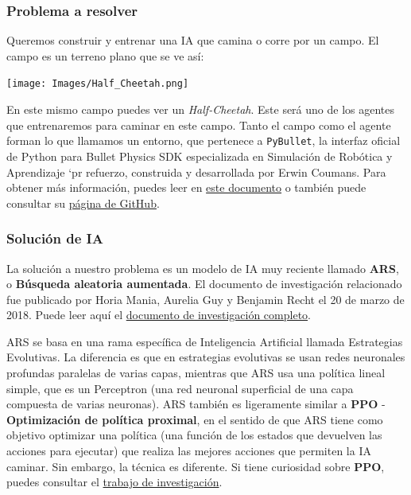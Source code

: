 \documentclass[
]{book}
\begin{document}
\hypertarget{problema-a-resolver-2}{%
\subsubsection{Problema a resolver}\label{problema-a-resolver-2}}

Queremos construir y entrenar una IA que camina o corre por un campo. El campo es un terreno plano que se ve así:

\texttt{[image: Images/Half\_Cheetah.png]}

En este mismo campo puedes ver un \emph{Half-Cheetah}. Este será uno de los agentes que entrenaremos para caminar en este campo. Tanto el campo como el agente forman lo que llamamos un entorno, que pertenece a \texttt{PyBullet}, la interfaz oficial de Python para Bullet Physics SDK especializada en Simulación de Robótica y Aprendizaje `pr refuerzo, construida y desarrollada por Erwin Coumans. Para obtener más información, puedes leer en \href{https://docs.google.com/document/d/10sXEhzFRSnvFcl3XxNGhnD4N2SedqwdAvK3dsihxVUA/edit}{este documento} o también puede consultar su \href{https://github.com/bulletphysics/bullet3}{página de GitHub}.

\hypertarget{soluciuxf3n-de-ia-2}{%
\subsubsection{Solución de IA}\label{soluciuxf3n-de-ia-2}}

La solución a nuestro problema es un modelo de IA muy reciente llamado \textbf{ARS}, o \textbf{Búsqueda aleatoria aumentada}. El documento de investigación relacionado fue publicado por Horia Mania, Aurelia Guy y Benjamin Recht el 20 de marzo de 2018. Puede leer aquí el \href{https://arxiv.org/pdf/1803.07055.pdf}{documento de investigación completo}.

ARS se basa en una rama específica de Inteligencia Artificial llamada Estrategias Evolutivas. La diferencia es que en estrategias evolutivas se usan redes neuronales profundas paralelas de varias capas, mientras que ARS usa una política lineal simple, que es un Perceptron (una red neuronal superficial de una capa compuesta de varias neuronas). ARS también es ligeramente similar a \textbf{PPO} - \textbf{Optimización de política proximal}, en el sentido de que ARS tiene como objetivo optimizar una política (una función de los estados que devuelven las acciones para ejecutar) que realiza las mejores acciones que permiten la IA caminar. Sin embargo, la técnica es diferente. Si tiene curiosidad sobre \textbf{PPO}, puedes consultar el \href{https://arxiv.org/pdf/1707.06347.pdf}{trabajo de investigación}.
\end{document}
